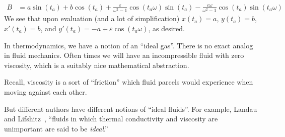 \begin{node}[Kinematics]
\begin{example}
\begin{subequations}
\begin{align*}
B &= a\sin(t_{a}) + b\cos(t_{a}) +\frac{\varepsilon}{\omega^{2}-1}\cos(t_{a}\omega)\sin(t_{a})-\frac{\varepsilon\omega}{\omega^{2}-1}\cos(t_{a})\sin(t_{a}\omega)
\end{align*}
\end{subequations}
We see that upon evaluation (and a lot of simplification) $x(t_{a})=a$,
$y(t_{a})=b$, $x'(t_{a})=b$, and
$y'(t_{a})=-a+\varepsilon\cos(t_{a}\omega)$, as desired.
\end{example}
\end{node} %

\begin{node}\label{fluids:describing-000N}%
In thermodynamics, we have a notion of an ``ideal gas''. There is no
exact analog in fluid mechanics. Often times we will have an
incompressible fluid with zero viscosity, which is a suitably nice
mathematical abstraction.

Recall, viscosity is a sort of ``friction'' which fluid parcels would
experience when moving against each other.

But different authors have different notions of ``ideal fluids''.  For
example, Landau and Lifshitz~\cite[\S2]{landau1987fluids}, ``fluids in
which thermal conductivity and viscosity are unimportant are said to be
\emph{ideal}.''
\end{node}